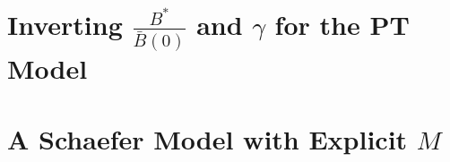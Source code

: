 \documentclass[12pt]{ucscthesis}
\begin{document}
%
%
%
%
%
%

%
%
%

%
\appendix

%
\chapter{Inverting $\frac{B^*}{\bar B(0)}$ and $\gamma$ for the PT Model \label{lambApp}}


%
\chapter{A Schaefer Model with Explicit $M$ \label{mApp}}

\end{document}
